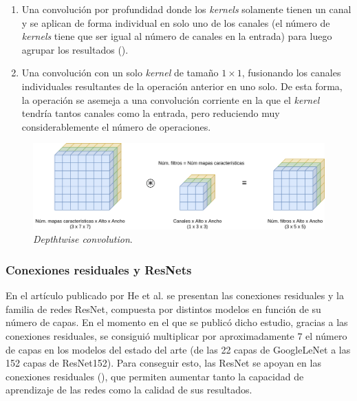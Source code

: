 \begin{itemize}
\begin{enumerate}
\item Una convolución por profundidad donde los \textit{kernels} solamente tienen un canal y se aplican de forma individual en solo uno de los canales (el número de \textit{kernels} tiene que ser igual al número de canales en la entrada) para luego agrupar los resultados ().
\item Una convolución con un solo \textit{kernel} de tamaño $1\times1$, fusionando los canales individuales resultantes de la operación anterior en uno solo. De esta forma, la operación se asemeja a una convolución corriente en la que el \textit{kernel} tendría tantos canales como la entrada, pero reduciendo muy considerablemente el número de operaciones.
\end{enumerate}

\begin{figure}[H]
\centering
\includegraphics[width=0.9\linewidth]{imagenes/convolucion-depthwise.png} 
\captionsetup{width=.9\linewidth}
\caption{\textit{Depthtwise convolution}.}
\label{fig:convolucion-depthwise}
\end{figure}

\end{itemize}

\subsubsection{Conexiones residuales y ResNets}

En el artículo publicado por He et al. \cite{resnet} se presentan las conexiones residuales y la familia de redes ResNet, compuesta por distintos modelos en función de su número de capas. En el momento en el que se publicó dicho estudio, gracias a las conexiones residuales, se consiguió multiplicar por aproximadamente $7$ el número de capas en los modelos del estado del arte (de las 22 capas de GoogleLeNet \cite{googlelenet} a las 152 capas de ResNet152). Para conseguir esto, las ResNet se apoyan en las conexiones residuales (), que permiten aumentar tanto la capacidad de aprendizaje de las redes como la calidad de sus resultados.

